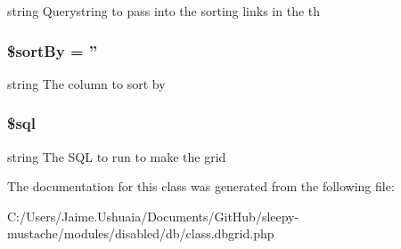 string Querystring to pass into the sorting links in the th \hypertarget{class_db_grid_ae4a5f363089eeaaa9f463a99c6503bcb}{
\subsubsection[{\$sort\-By}]{\setlength{\rightskip}{0pt plus 5cm}\$sort\-By = ''\hspace{0.3cm}{\ttfamily [protected]}}}\label{class_db_grid_ae4a5f363089eeaaa9f463a99c6503bcb}
string The column to sort by \hypertarget{class_db_grid_a047170d6020a882807665812a27e2525}{
\subsubsection[{\$sql}]{\setlength{\rightskip}{0pt plus 5cm}\$sql\hspace{0.3cm}{\ttfamily [protected]}}}\label{class_db_grid_a047170d6020a882807665812a27e2525}
string The S\-Q\-L to run to make the grid 

The documentation for this class was generated from the following file\-:\begin{DoxyCompactItemize}
\item 
C\-:/\-Users/\-Jaime.\-Ushuaia/\-Documents/\-Git\-Hub/sleepy-\/mustache/modules/disabled/db/class.\-dbgrid.\-php\end{DoxyCompactItemize}
